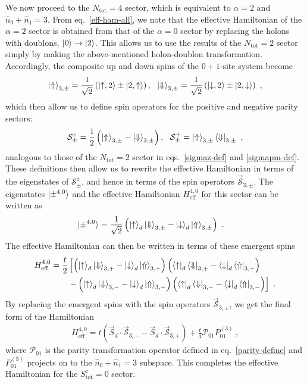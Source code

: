 We now proceed to the \(N_\text{tot}=4\) sector, which is equivalent to \(\alpha=2\) and \(\hat n_0 + \hat n_1 = 3\). From eq.~\eqref{eff-ham-all}, we note that the effective Hamiltonian of the \(\alpha=2\) sector is obtained from that of the \(\alpha=0\) sector by replacing the holons with doublons, \(\ket{0} \to \ket{2}\). This allows us to use the results of the \(N_\text{tot}=2\) sector simply by making the above-mentioned holon-doublon transformation. Accordingly, the composite up and down spins of the \(0+1\)-site system become
\begin{eqnarray}
	\ket{\Uparrow}_{3,\pm} = \frac{1}{\sqrt 2}\left(\ket{\uparrow,2} \pm \ket{2, \uparrow}\right), ~ ~\ket{\Downarrow}_{3,\pm} = \frac{1}{\sqrt 2}\left( \ket{\downarrow, 2} \pm \ket{2, \downarrow}\right)~,
\end{eqnarray}
which then allow us to define spin operators for the positive and negative parity sectors:
\begin{eqnarray}
	\mathcal{S}^z_\pm = \frac{1}{2}\left(\ket{\Uparrow}_{3,\pm} - \ket{\Downarrow}_{3,\pm}\right), ~~\mathcal{S}^+_\pm = \ket{\Uparrow}_{3,\pm}\bra{\Downarrow}_{3,\pm}~,
\end{eqnarray}
analogous to those of the \(N_\text{tot}=2\) sector in eqs.~\eqref{sigmaz-def} and \eqref{sigmapm-def}. These definitions then allow us to rewrite the effective Hamiltonian in terms of the eigenstates of \(\mathcal{S}^z_\pm\), and hence in terms of the spin operators \(\vec{\mathcal{S}}_{3,\pm}\). The eigenstates \(\ket{\pm^{4,0}}\) and the effective Hamiltonian \(H_\text{eff}^{4,0}\) for this sector can be written as
\begin{eqnarray}
	\ket{\pm^{4,0}} &= \frac{1}{\sqrt 2}\left( \ket{\uparrow}_d\ket{\Downarrow}_{3,\pm} -  \ket{\downarrow}_d\ket{\Uparrow}_{3,\pm}\right)~.
\end{eqnarray}
The effective Hamiltonian can then be written in terms of these emergent spins
\begin{eqnarray}
	H_\text{eff}^{4,0} = \frac{t}{2}&\left[\left( \ket{\uparrow}_d\ket{\Downarrow}_{3,+} -  \ket{\downarrow}_d\ket{\Uparrow}_{3,+}\right)\left( \bra{\uparrow}_d\bra{\Downarrow}_{3,+} -  \bra{\downarrow}_d\bra{\Uparrow}_{3,+}\right)\right.\nonumber \\
					&\left.- \left(\ket{\uparrow}_d\ket{\Downarrow}_{3,-} -  \ket{\downarrow}_d\ket{\Uparrow}_{3,-}\right)\left( \bra{\uparrow}_d\bra{\Downarrow}_{3,-} -  \bra{\downarrow}_d\bra{\Uparrow}_{3,-}\right)\right] ~.
\end{eqnarray}
By replacing the emergent spins with the spin operators \(\vec{\mathcal{S}}_{3,\pm}\), we get the final form of the Hamiltonian
\begin{eqnarray}
	H_\text{eff}^{4,0} = t\left( \vec{S}_d\cdot\vec{\mathcal{S}}_{3,-} - \vec{S}_d\cdot\vec{\mathcal{S}}_{3,+}\right) + \frac{t}{4}\mathcal{P}_{01}P_{01}^{(3)}~,
\end{eqnarray}
where \(\mathcal{P}_{01}\) is the parity transformation operator defined in eq.~\eqref{parity-define} and \(P_{01}^{(3)}\) projects on to the \(\hat n_0 + \hat n_1 = 3\) subspace. This completes the effective Hamiltonian for the \(S^z_\text{tot}=0\) sector.

